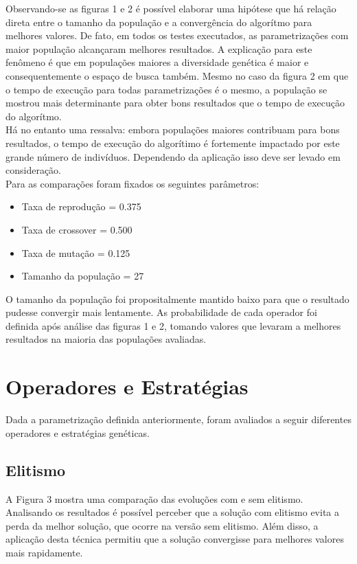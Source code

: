 \documentclass[conference]{IEEEtran}
\begin{document}
Observando-se as figuras 1 e 2 é possível elaborar uma hipótese que há relação direta
entre o tamanho da população e a convergência do algorítmo para melhores valores.
De fato, em todos os testes executados, as parametrizações com maior população
alcançaram melhores resultados. A explicação para este fenômeno é que em
populações maiores a diversidade genética é maior e consequentemente o espaço de
busca também. Mesmo no caso da figura 2 em que o tempo de execução para todas
parametrizações é o mesmo, a população se mostrou mais determinante para obter
bons resultados que o tempo de execução do algorítmo.\\
Há no entanto uma ressalva: embora populações maiores contribuam para bons 
resultados, o tempo de execução do algorítimo é fortemente impactado por este 
grande número de indivíduos. Dependendo da aplicação isso deve ser levado em 
consideração.\\

Para as comparações foram fixados os seguintes parâmetros:
\begin{itemize}
\item Taxa de reprodução = 0.375
\item Taxa de crossover = 0.500
\item Taxa de mutação = 0.125
\item Tamanho da população = 27
\end{itemize}

O tamanho da população foi propositalmente mantido baixo para que o 
resultado pudesse convergir mais lentamente. As probabilidade de cada operador
foi definida após análise das figuras 1 e 2, tomando valores que levaram a 
melhores resultados na maioria das populações avaliadas.

\section{Operadores e Estratégias}
Dada a parametrização definida anteriormente, foram avaliados a seguir 
diferentes operadores e estratégias genéticas.

\subsection{Elitismo}
A Figura 3 mostra uma comparação das evoluções com e sem elitismo. Analisando os
resultados é possível perceber que a solução com elitismo evita a perda da melhor 
solução, que ocorre na versão sem elitismo. Além disso, a aplicação desta técnica
permitiu que a solução convergisse para melhores valores mais rapidamente.
\end{document}
